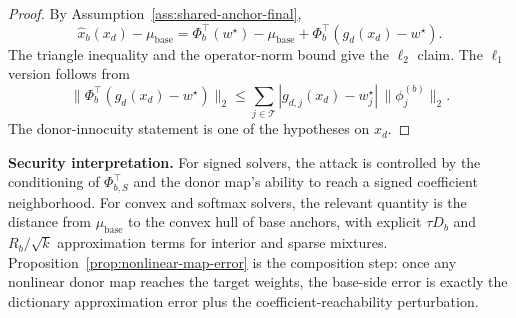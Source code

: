 \begin{proof}
By Assumption~\ref{ass:shared-anchor-final},
\[
\widehat{x}_b(x_d)-\mu_{\mathrm{base}}
=
\Phi_b^\top(w^\star)-\mu_{\mathrm{base}}
+
\Phi_b^\top(g_d(x_d)-w^\star).
\]
The triangle inequality and the operator-norm bound give the $\ell_2$ claim. The $\ell_1$ version follows from
\[
\|\Phi_b^\top(g_d(x_d)-w^\star)\|_2
\le
\sum_{j\in\mathcal{T}}|g_{d,j}(x_d)-w_j^\star|\,\|\phi_j^{(b)}\|_2.
\]
The donor-innocuity statement is one of the hypotheses on $x_d$.
\end{proof}

\noindent\textbf{Security interpretation.}
For signed solvers, the attack is controlled by the conditioning of $\Phi_{b,S}^\top$ and the donor map's ability to reach a signed coefficient neighborhood. For convex and softmax solvers, the relevant quantity is the distance from $\mu_{\mathrm{base}}$ to the convex hull of base anchors, with explicit $\tau D_b$ and $R_b/\sqrt{k}$ approximation terms for interior and sparse mixtures. Proposition~\ref{prop:nonlinear-map-error} is the composition step: once any nonlinear donor map reaches the target weights, the base-side error is exactly the dictionary approximation error plus the coefficient-reachability perturbation.
